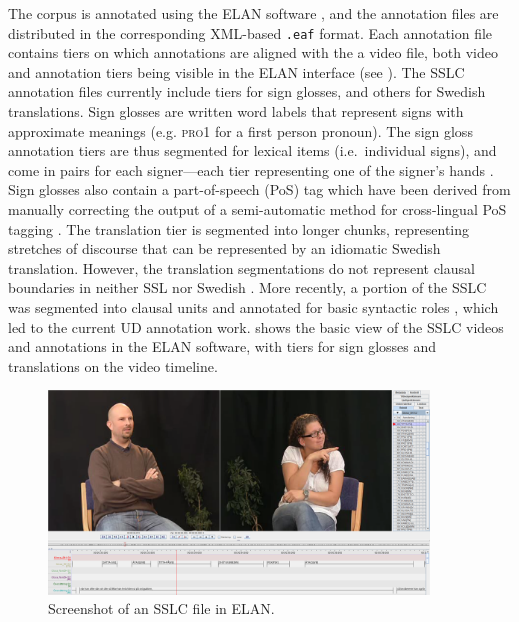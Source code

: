 \documentclass[11pt]{article}
\begin{document}
The corpus is annotated using the ELAN software \cite{Wittenburg2006elan}, and the annotation files are distributed in the corresponding XML-based \texttt{.eaf} format. Each annotation file contains tiers on which annotations are aligned with the a video file, both video and annotation tiers being visible in the ELAN interface (see ). The SSLC annotation files currently include tiers for sign glosses, and others for Swedish translations. Sign glosses are written word labels that represent signs with approximate meanings (e.g. \textsc{pro1} for a first person pronoun). The sign gloss annotation tiers are thus segmented for lexical items (i.e.~individual signs), and come in pairs for each signer---each tier representing one of the signer's hands \cite{Mesch2015gloss}. Sign glosses also contain a part-of-speech (PoS) tag which have been derived from manually correcting the output of a semi-automatic method for cross-lingual PoS tagging \cite{Ostling2015enriching}. The translation tier is segmented into longer chunks, representing stretches of discourse that can be represented by an idiomatic Swedish translation. However, the translation segmentations do not represent clausal boundaries in neither SSL nor Swedish \cite{Borstell2014segmenting}. More recently, a portion of the SSLC was segmented into clausal units and annotated for basic syntactic roles \cite{Borstell2016syntactic}, which led to the current UD annotation work.  shows the basic view of the SSLC videos and annotations in the ELAN software, with tiers for sign glosses and translations on the video timeline.

\begin{figure}
	\centering
	\includegraphics[width=0.9\textwidth]{sslc_elan.png}
	\caption{Screenshot of an SSLC file in ELAN.}
	\label{fig:sslc_elan}
\end{figure}
\end{document}
